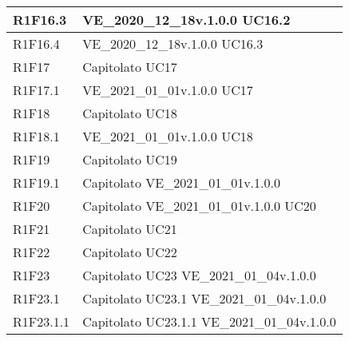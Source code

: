\begin{center}
\begin{longtable}{|p{22mm}|p{44mm}|}
R1F16.3 &
VE\_2020\_12\_18v.1.0.0 \newline
UC16.2 
\\
\hline

R1F16.4 &
VE\_2020\_12\_18v.1.0.0 \newline
UC16.3 
\\
\hline

R1F17 &
Capitolato \newline
UC17 
\\
\hline

R1F17.1 &
VE\_2021\_01\_01v.1.0.0 \newline
UC17 
\\
\hline

R1F18 &
Capitolato \newline
UC18 
\\
\hline

R1F18.1 &
VE\_2021\_01\_01v.1.0.0 \newline
UC18 
\\
\hline

R1F19 &
Capitolato \newline
UC19 
\\
\hline

R1F19.1 &
Capitolato \newline
VE\_2021\_01\_01v.1.0.0 
\\
\hline

R1F20 &
Capitolato \newline
VE\_2021\_01\_01v.1.0.0 \newline
UC20 
\\
\hline

R1F21 &
Capitolato \newline
UC21 
\\
\hline

R1F22 &
Capitolato \newline
UC22 
\\
\hline

R1F23 &
Capitolato \newline
UC23 \newline
VE\_2021\_01\_04v.1.0.0 
\\
\hline

R1F23.1 &
Capitolato \newline
UC23.1 \newline
VE\_2021\_01\_04v.1.0.0 
\\
\hline

R1F23.1.1 &
Capitolato \newline
UC23.1.1 \newline
VE\_2021\_01\_04v.1.0.0 
\\
\hline


\end{longtable}
\end{center}
